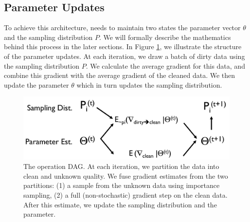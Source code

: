 \subsection{Parameter Updates}
To achieve this architecture, \sys needs to maintain two states the parameter vector $\theta$ and the sampling distribution $P$.
We will formally describe the mathematics behind this process in the later sections.
In Figure \ref{param-arch}, we illustrate the structure of the parameter updates.
At each iteration, we draw a batch of dirty data using the sampling distribution $P$.
We calculate the average gradient for this data, and combine this gradient with the average gradient of the cleaned data.
We then update the parameter $\theta$ which in turn updates the sampling distribution.

\begin{figure}[t]
\centering
 \includegraphics[width=\columnwidth]{figs/cmldag.pdf}
 \caption{The \sysfull operation DAG. At each iteration, we partition the data into clean and unknown quality. We fuse gradient estimates from the two partitions: (1) a sample from the unknown data using importance sampling, (2) a full (non-stochastic) gradient step on the clean data. After this estimate, we update the sampling distribution and the parameter.   \label{param-arch}}
\end{figure}



